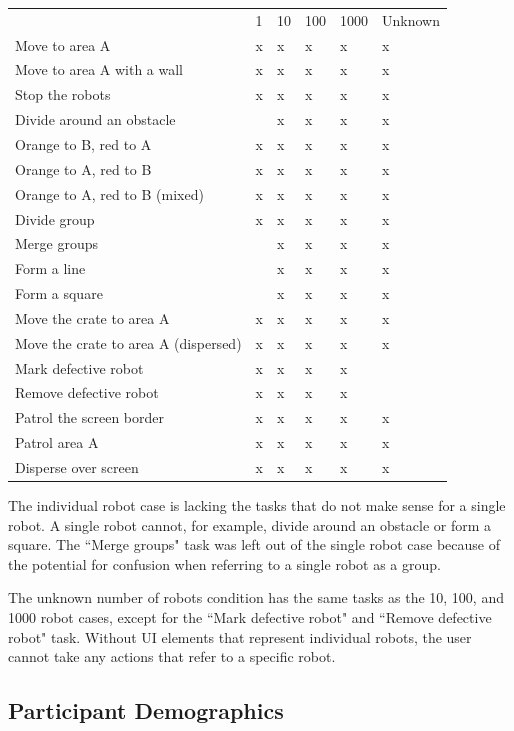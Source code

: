 \begin{tabular}{l|l|l|l|l|l}
	& 1 & 10 & 100 & 1000 & Unknown \\
	Move to area A & x & x & x & x & x\\
	Move to area A with a wall & x & x & x & x & x \\
	Stop the robots & x & x & x & x & x\\
	Divide around an obstacle & & x & x & x & x \\
	Orange to B, red to A & x & x & x & x & x \\
	Orange to A, red to B & x & x & x & x & x \\
	Orange to A, red to B (mixed) & x & x & x & x & x \\
	Divide group & x & x & x & x & x \\
	Merge groups & & x & x & x & x \\
	Form a line & & x & x & x & x \\
	Form a square & & x & x & x & x \\
	Move the crate to area A & x & x & x & x & x \\
	Move the crate to area A (dispersed) & x & x & x & x & x\\
	Mark defective robot & x & x & x & x & \\
	Remove defective robot & x & x & x & x &  \\
	Patrol the screen border & x & x & x & x & x \\
	Patrol area A & x & x & x & x & x \\
	Disperse over screen & x & x & x & x & x \\
\end{tabular}

The individual robot case is lacking the tasks that do not make sense for a single robot. A single robot cannot, for example, divide around an obstacle or form a square. 
The ``Merge groups" task was left out of the single robot case because of the potential for confusion when referring to a single robot as a group. 

The unknown number of robots condition has the same tasks as the 10, 100, and 1000 robot cases, except for the ``Mark defective robot" and ``Remove defective robot" task. 
Without UI elements that represent individual robots, the user cannot take any actions that refer to a specific robot. 

\subsection{Participant Demographics} \label{section:Participant_Demographics}

